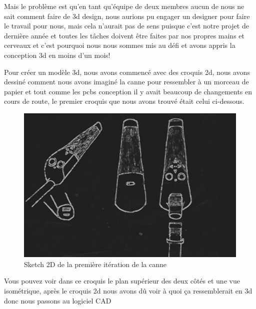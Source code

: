 \FloatBarrier

Mais le problème est qu’en tant qu’équipe de deux membres aucun de nous ne sait comment faire de 3d design, nous aurions pu engager un designer pour faire le travail pour nous, mais cela n’aurait pas de sens puisque c’est notre projet de dernière année et  toutes les tâches doivent être faites par nos propres mains et cerveaux et c’est pourquoi nous nous sommes mis au défi et avons appris la conception 3d en moins d’un mois! 

Pour créer un modèle 3d, nous avons commencé avec des croquis 2d, nous avons dessiné comment nous avons imaginé la canne pour ressembler à un morceau de papier et tout comme les pcbs conception il y avait beaucoup de changements en cours de route, le premier croquis que nous avons trouvé était celui ci-dessous.

\begin{figure}[!htbp]
    \centering
    \includegraphics[width=\linewidth]{assets/conception1/img124.jpg}
    \caption{Sketch 2D de la première itération de la canne}
\end{figure}

\FloatBarrier

Vous pouvez voir dans ce croquis le plan supérieur des deux côtés et une vue isométrique, après le croquis 2d nous avons dû voir à quoi ça ressemblerait en 3d donc nous passons au logiciel CAD


